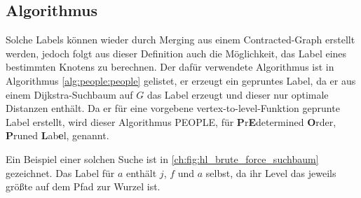 \subsection{Algorithmus}

Solche Labels können wieder durch Merging aus einem Contracted-Graph erstellt werden, jedoch folgt aus dieser Definition auch die Möglichkeit, das Label eines bestimmten Knotens zu berechnen.
Der dafür verwendete Algorithmus ist in Algorithmus \ref{alg:people:people} gelistet, er erzeugt ein gepruntes Label, da er aus einem Dijkstra-Suchbaum auf $G$ das Label erzeugt und dieser nur optimale Distanzen enthält.
Da er für eine vorgebene vertex-to-level-Funktion geprunte Label erstellt, wird dieser Algorithmus PEOPLE, für \textbf{P}r\textbf{E}determined \textbf{O}rder, \textbf{P}runed \textbf{L}ab\textbf{e}l, genannt.

Ein Beispiel einer solchen Suche ist in \autoref{ch:fig:hl_brute_force_suchbaum} gezeichnet.
Das Label für $a$ enthält $j$, $f$ und $a$ selbst, da ihr Level das jeweils größte auf dem Pfad zur Wurzel ist.


